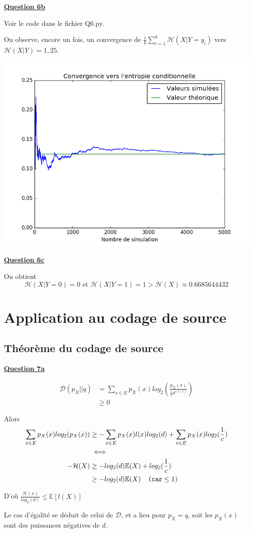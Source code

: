 \documentclass[a4paper,twoside,10pt]{article}
\renewcommand{\H}{\mathcal{H}}
\newcommand{\D}{\mathcal{D}}
\newenvironment{Q}[1]{%
\vspace{1ex}
\underline{\textbf{Question #1\\}}
\newline
}{
\vspace{2ex}
}
\begin{document}
\begin{Q}{6b}
Voir le code dans le fichier Q6.py.

On observe, encore un fois, un convergence de $\frac{1}{k} \sum_{i = 1}^{k} \H(X|Y = y_i)$ vers $\H(X|Y) = 1,25$.

\begin{center}
\includegraphics[width=\textwidth]{Q6b.png}
\end{center}

\end{Q}

\begin{Q}{6c}
On obtient \[\H(X|Y = 0) = 0 \text{ et } \H(X|Y = 1) = 1 > \H(X) \approx 0.6685644432 \]
\end{Q}

\section{Application au codage de source}
\subsection{Théorème du codage de source}

\begin{Q}{7a}

\begin{align*}
\D(p_X||q) &= \sum_{x \in E}p_X(x)log_2(\frac{p_X(x)}{\frac{1}{c}d^{-l(x)}}) \\
&\geq 0
\end{align*}

Alors
\begin{align*}
\sum_{x \in E}p_X(x)log_2(p_X(x)) &\geq  -\sum_{x \in E}p_X(x)l(x)log_2(d) + \sum_{x \in E}p_X(x)log_2(\frac{1}{c}) \\
 &\iff\\
-\H(X) &\geq -log_2(d) \mathbb{E}(X) + log_2(\frac{1}{c})
\\ &\geq -log_2(d) \mathbb{E}(X) \texttt{\quad(car} \leq 1 \textsc{)}
\end{align*}

D'où $\frac{\H(x)}{log_2(d)} \leq \mathbb{E}[l(X)]$
 
Le cas d'égalité se déduit de celui de $\D$, et a lieu pour $p_X = q$, soit les $p_X(x)$ sont des puissances négatives de $d$.
\end{Q}
\end{document}
